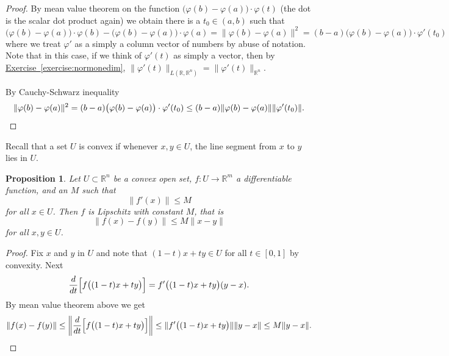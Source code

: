 \documentclass[12pt]{book}
\newcommand{\snorm}[1]{\lVert {#1} \rVert}
\newcommand{\norm}[1]{\left\lVert {#1} \right\rVert}
\newcommand{\R}{{\mathbb{R}}}
\theoremstyle{plain}
\newtheorem{prop}[thm]{Proposition}
\theoremstyle{remark}
\theoremstyle{definition}
\theoremstyle{exercise}
\theoremstyle{example}
\newcommand{\exerciseref}[1]{\hyperref[#1]{Exercise~\ref*{#1}}}
\begin{document}
\begin{proof}
By mean value theorem on the function
$\bigl(\varphi(b)-\varphi(a) \bigr) \cdot \varphi(t)$
(the dot is the scalar dot product again) we obtain
there is a $t_0 \in (a,b)$ such that
\begin{equation*}
\bigl(\varphi(b)-\varphi(a) \bigr) \cdot \varphi(b) - 
\bigl(\varphi(b)-\varphi(a) \bigr) \cdot \varphi(a)  = 
\snorm{\varphi(b)-\varphi(a)}^2
=
(b-a)
\bigl(\varphi(b)-\varphi(a) \bigr) \cdot \varphi'(t_0)
\end{equation*}
where we treat $\varphi'$ as a simply a column vector of numbers by abuse of
notation.  Note that
in this case, if we think of $\varphi'(t)$ as simply a vector, then by
\exerciseref{exercise:normonedim},
$\snorm{\varphi'(t)}_{L(\R,\R^n)} = \snorm{\varphi'(t)}_{\R^n}$.

By Cauchy-Schwarz inequality
\begin{equation*}
\snorm{\varphi(b)-\varphi(a)}^2
=
(b-a)\bigl(\varphi(b)-\varphi(a) \bigr) \cdot \varphi'(t_0)
\leq
(b-a)
\snorm{\varphi(b)-\varphi(a)} \snorm{\varphi'(t_0)} . \qedhere
\end{equation*}
\end{proof}

Recall that a set $U$ is convex
if whenever $x,y \in U$, the line segment from
$x$ to $y$ lies in $U$.

\begin{prop} \label{mv:prop:convexlip}
Let $U \subset \R^n$ be a convex open set, $f \colon U \to \R^m$
a differentiable function, and an $M$ such that
\begin{equation*}
\snorm{f'(x)} \leq M
\end{equation*}
for all $x \in U$.  Then $f$ is Lipschitz with constant $M$, that is
\begin{equation*}
\snorm{f(x)-f(y)} \leq M \snorm{x-y}
\end{equation*}
for all $x,y \in U$.
\end{prop}

\begin{proof}
Fix $x$ and $y$ in $U$ and note that
$(1-t)x+ty \in U$ for all $t \in [0,1]$
by convexity.
Next
\begin{equation*}
\frac{d}{dt} \Bigl[f\bigl((1-t)x+ty\bigr)\Bigr]
=
f'\bigl((1-t)x+ty\bigr) (y-x) .
\end{equation*}
By mean value theorem above we get
\begin{equation*}
\snorm{f(x)-f(y)} \leq
\norm{\frac{d}{dt} \Bigl[ f\bigl((1-t)x+ty\bigr) \Bigr] } \leq
\snorm{f'\bigl((1-t)x+ty\bigr)} \snorm{y-x} \leq
M \snorm{y-x} . \qedhere
\end{equation*}
\end{proof}
\end{document}
